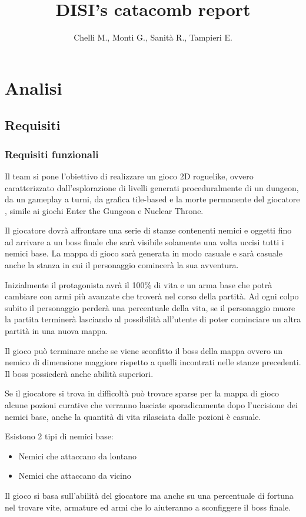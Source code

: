 \documentclass[a4paper,12pt]{report}
\title{DISI's catacomb report}
\author{Chelli M., Monti G., Sanità R., Tampieri E.}
\begin{document}
    \maketitle
    \tableofcontents
    \chapter{Analisi}
    \section{Requisiti}
    \subsection{Requisiti funzionali}
    \par Il team si pone l'obiettivo di realizzare un gioco 2D roguelike,
    ovvero caratterizzato dall'esplorazione di livelli generati proceduralmente
    di un dungeon, da un gameplay a turni, da grafica tile-based e la morte
    permanente del giocatore \cite{wiki:Roguelike}, simile ai giochi Enter the
    Gungeon e Nuclear Throne.
    \par Il giocatore dovrà affrontare una serie di stanze contenenti
    nemici e oggetti fino ad arrivare a un boss finale che sarà visibile solamente una volta uccisi tutti i nemici base.
    La mappa di gioco sarà generata in modo casuale e sarà casuale anche la stanza in cui il personaggio comincerà
    la sua avventura.
    \par Inizialmente il protagonista avrà il 100\% di vita e un arma base che potrà
    cambiare con armi più avanzate che troverà nel corso
    della partità. Ad ogni colpo subito il personaggio perderà una percentuale della
    vita, se il personaggio muore la partita terminerà lasciando al possibilità all'utente di
    poter cominciare un altra partità in una nuova mappa.
    \par Il gioco può terminare anche se viene sconfitto il boss della mappa ovvero
    un nemico di dimensione maggiore rispetto a quelli incontrati nelle stanze precedenti.
    Il boss possiederà anche abilità superiori.
    \par Se il giocatore si trova in difficoltà può trovare sparse per la mappa di gioco
    alcune pozioni curative che verranno lasciate sporadicamente dopo l'uccisione dei nemici base,
    anche la quantità di vita rilasciata dalle pozioni è casuale.
    \par Esistono 2 tipi di nemici base:
    \begin{itemize}
        \item Nemici che attaccano da lontano
        \item Nemici che attaccano da vicino
    \end{itemize}
    \par Il gioco si basa sull'abilità del giocatore ma anche su una percentuale di
    fortuna nel trovare vite, armature ed armi che lo aiuteranno a sconfiggere il
    boss finale.
\end{document}
